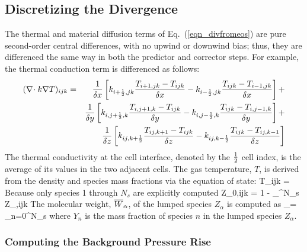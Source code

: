 \subsection{Discretizing the Divergence}
\label{div_discret}

The thermal and material diffusion terms of Eq.~(\ref{eqn_divfromeos}) are pure second-order central differences,
with no upwind or downwind bias; thus, they are differenced the same
way in both the predictor and corrector steps. For example, the thermal
conduction term is differenced as follows:
\begin{eqnarray}
(\nabla\!\cdot k \nabla T)_{ijk} &=&
              \frac{1}{\delta x}
         \left[k_{i+\frac{1}{2},jk}\frac{T_{i+1,jk}-T_{ijk}}{\delta x}
              -k_{i-\frac{1}{2},jk}\frac{T_{ijk}-T_{i-1,jk}}{\delta x}\right]+  \nonumber \\
            &&\frac{1}{\delta y}
         \left[k_{i,j+\frac{1}{2},k}\frac{T_{i,j+1,k}-T_{ijk}}{\delta y}
              -k_{i,j-\frac{1}{2},k}\frac{T_{ijk}-T_{i,j-1,k}}{\delta y}\right]+ \nonumber \\
            &&\frac{1}{\delta z}
         \left[k_{ij,k+\frac{1}{2}}\frac{T_{ij,k+1}-T_{ijk}}{\delta z}
              -k_{ij,k-\frac{1}{2}}\frac{T_{ijk}-T_{ij,k-1}}{\delta z}\right]
\end{eqnarray}
The thermal conductivity at the cell interface, denoted by the $\frac{1}{2}$ cell index, is the average of its values in the two adjacent cells.
The gas temperature, $T$, is derived from the density and species mass fractions via the equation of state:
\be T_{ijk} = \ee
Because only species 1 through $N_s$ are explicitly computed
\be Z_{0,ijk} =  1 -  \sum_{}^{N_s} Z_{\alpha,ijk} \ee
The molecular weight, $\overline{W}_\alpha$, of the lumped species $Z_\alpha$ is computed as
\be \bW_\alpha =  \sum_{n=0}^{N_s}  \ee
where $Y_n$ is the mass fraction of species $n$ in the lumped species $Z_\alpha$.


\subsubsection{Computing the Background Pressure Rise}

